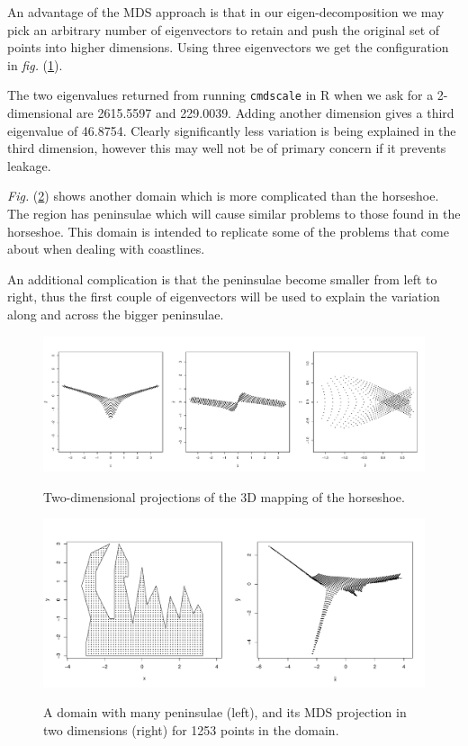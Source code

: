 \documentclass[a4paper,10pt]{amsart}
\newcommand{\fig}[1]{\emph{fig.} (\ref{#1})}
\newcommand{\Fig}[1]{\emph{Fig.} (\ref{#1})}
\begin{document}
An advantage of the MDS approach is that in our eigen-decomposition we may pick an arbitrary number of eigenvectors to retain and push the original set of points into higher dimensions. Using three eigenvectors we get the configuration in \fig{ramsay-mds-3d}.

The two eigenvalues returned from running \texttt{cmdscale} in \textsf{R} when we ask for a 2-dimensional are 2615.5597 and 229.0039. Adding another dimension gives a third eigenvalue of 46.8754. Clearly significantly less variation is being explained in the third dimension, however this may well not be of primary concern if it prevents leakage.


\Fig{wt2dia} shows another domain which is more complicated than the horseshoe. The region has peninsulae which will cause similar problems to those found in the horseshoe. This domain is intended to replicate some of the problems that come about when dealing with coastlines.


An additional complication is that the peninsulae become smaller from left to right, thus the first couple of eigenvectors will be used to explain the variation along and across the bigger peninsulae.




\begin{figure}
\centering
\includegraphics[trim=0in 0.5in 0in 0.25in, width=5.5in]{figs/ramsay-mds-3d.pdf} \\
\caption{Two-dimensional projections of the 3D mapping of the horseshoe.}
\label{ramsay-mds-3d}
\end{figure}

\begin{figure}
\centering
\includegraphics[width=6in]{figs/wt2-mds.pdf}\\
\caption{A domain with many peninsulae (left), and its MDS projection in two dimensions (right) for 1253 points in the domain.}
\label{wt2dia}
\end{figure}
\end{document}

